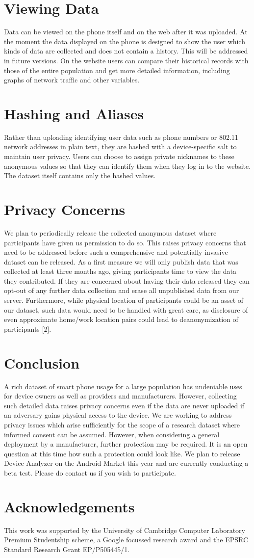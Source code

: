 \documentclass{sig-alternate}
\begin{document}
\section{Viewing Data}
Data can be viewed on the phone itself and on the web after it was uploaded.
At the moment the data displayed on the phone is designed to show the user which kinds of data are collected and does not contain a history.
This will be addressed in future versions.
On the website users can compare their historical records with those of the entire population and get more detailed information, including graphs of network traffic and other variables.

\section{Hashing and Aliases}
Rather than uploading identifying user data such as phone numbers or 802.11 network addresses in plain text, they are hashed with a device-specific salt to maintain user privacy.
Users can choose to assign private nicknames to these anonymous values so that they can identify them when they log in to the website.
The dataset itself contains only the hashed values.

\section{Privacy Concerns}
We plan to periodically release the collected anonymous dataset where participants have given us permission to do so.
This raises privacy concerns that need to be addressed before such a comprehensive and potentially invasive dataset can be released.
As a first measure we will only publish data that was collected at least three months ago, giving participants time to view the data they contributed.
If they are concerned about having their data released they can opt-out of any further data collection and erase all unpublished data from our server.
Furthermore, while physical location of participants could be an asset of our dataset, such data would need to be handled with great care, as disclosure of even approximate home/work location pairs could lead to deanonymization of participants [2].

\section{Conclusion}
A rich dataset of smart phone usage for a large population has undeniable uses for device owners as well as providers and manufacturers.
However, collecting such detailed data raises privacy concerns even if the data are never uploaded if an adversary gains physical access to the device.
We are working to address privacy issues which arise sufficiently for the scope of a research dataset where informed consent can be assumed.
However, when considering a general deployment by a manufacturer, further protection may be required.
It is an open question at this time how such a protection could look like.
We plan to release Device Analyzer on the Android Market this year and are currently conducting a beta test.
Please do contact us if you wish to participate.

\section{Acknowledgements}
This work was supported by the University of Cambridge Computer Laboratory Premium Studentship scheme, a Google focussed research award and the EPSRC Standard Research Grant EP/P505445/1.
\end{document}
